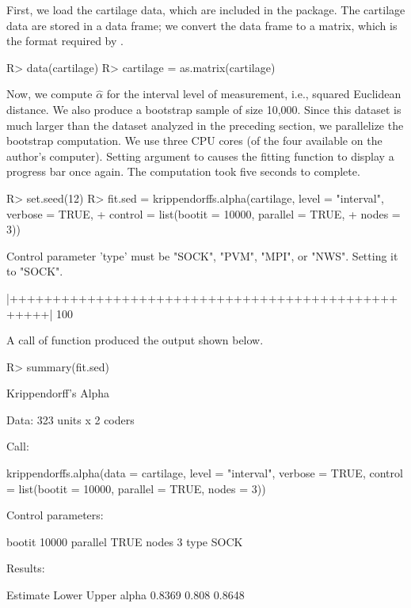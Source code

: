First, we load the cartilage data, which are included in the package. The cartilage data are stored in a data frame; we convert the data frame to a matrix, which is the format required by .

\begin{example}
R> data(cartilage)
R> cartilage = as.matrix(cartilage)
\end{example}

Now, we compute $\hat{\alpha}$ for the interval level of measurement, i.e., squared Euclidean distance. We also produce a bootstrap sample of size 10,000. Since this dataset is much larger than the dataset analyzed in the preceding section, we parallelize the bootstrap computation. We use three CPU cores (of the four available on the author's computer). Setting argument  to  causes the fitting function to display a progress bar once again. The computation took five seconds to complete.

\begin{example}
R> set.seed(12)
R> fit.sed = krippendorffs.alpha(cartilage, level = "interval", verbose = TRUE,
+                                control = list(bootit = 10000, parallel = TRUE,
+                                nodes = 3))

Control parameter 'type' must be "SOCK", "PVM", "MPI", or "NWS". Setting it to "SOCK".

  |++++++++++++++++++++++++++++++++++++++++++++++++++| 100%
\end{example}

A call of function  produced the output shown below.

\begin{example}
R> summary(fit.sed)

Krippendorff's Alpha

Data: 323 units x 2 coders

Call:

krippendorffs.alpha(data = cartilage, level = "interval", verbose = TRUE, 
    control = list(bootit = 10000, parallel = TRUE, nodes = 3))

Control parameters:
              
bootit   10000
parallel TRUE 
nodes    3    
type     SOCK 
              
Results:

      Estimate Lower  Upper
alpha   0.8369 0.808 0.8648
\end{example}

